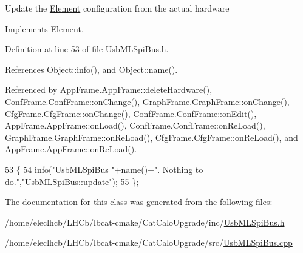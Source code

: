 Update the \hyperlink{classElement}{Element} configuration from the actual hardware 

Implements \hyperlink{classElement_a4e6c83efae95616ebddd03c793a26661}{Element}.



Definition at line 53 of file Usb\+M\+L\+Spi\+Bus.\+h.



References Object\+::info(), and Object\+::name().



Referenced by App\+Frame.\+App\+Frame\+::delete\+Hardware(), Conf\+Frame.\+Conf\+Frame\+::on\+Change(), Graph\+Frame.\+Graph\+Frame\+::on\+Change(), Cfg\+Frame.\+Cfg\+Frame\+::on\+Change(), Conf\+Frame.\+Conf\+Frame\+::on\+Edit(), App\+Frame.\+App\+Frame\+::on\+Load(), Conf\+Frame.\+Conf\+Frame\+::on\+Re\+Load(), Graph\+Frame.\+Graph\+Frame\+::on\+Re\+Load(), Cfg\+Frame.\+Cfg\+Frame\+::on\+Re\+Load(), and App\+Frame.\+App\+Frame\+::on\+Re\+Load().


\begin{DoxyCode}
53                  \{
54     \hyperlink{classObject_a644fd329ea4cb85f54fa6846484b84a8}{info}(\textcolor{stringliteral}{"UsbMLSpiBus "}+\hyperlink{classObject_a300f4c05dd468c7bb8b3c968868443c1}{name}()+\textcolor{stringliteral}{". Nothing to do."},\textcolor{stringliteral}{"UsbMLSpiBus::update"});
55   \};
\end{DoxyCode}


The documentation for this class was generated from the following files\+:\begin{DoxyCompactItemize}
\item 
/home/eleclhcb/\+L\+H\+Cb/lbcat-\/cmake/\+Cat\+Calo\+Upgrade/inc/\hyperlink{UsbMLSpiBus_8h}{Usb\+M\+L\+Spi\+Bus.\+h}\item 
/home/eleclhcb/\+L\+H\+Cb/lbcat-\/cmake/\+Cat\+Calo\+Upgrade/src/\hyperlink{UsbMLSpiBus_8cpp}{Usb\+M\+L\+Spi\+Bus.\+cpp}\end{DoxyCompactItemize}
